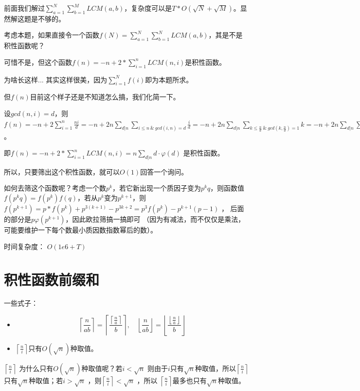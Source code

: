\begin{solution}
\label{exa:lcm2}
前面我们解过$\sum_{a=1}^{N}\sum_{b=1}^MLCM(a,b)$，复杂度可以是$T*O(\sqrt{N}+\sqrt{M})$。显然解这题是不够的。

考虑本题，如果直接令一个函数$f(N)=\sum_{a=1}^{N}\sum_{b=1}^NLCM(a,b)$，其是不是积性函数呢？

可惜不是，{\heiti 但这个函数$f(n)=-n+2*\sum_{i=1}^nLCM(n,i)$是积性函数。}

为啥长这样... 其实这样很美，因为$\sum_{i=1}^Nf(i)$即为本题所求。

但$f(n)$目前这个样子还是不知道怎么搞，我们化简一下。

设$gcd(n,i)=d$，则$f(n)=-n+2\sum_{i=1}^n\frac{ni}{d}=-n+2n\sum_{d|n}\sum_{i\le n \ \& \ gcd(i,n)=d}\frac{i}{d}=-n+2n\sum_{d|n}\sum_{k\le \frac{n}{d}\ \& \ gcd(k,\frac{n}{d})=1}k=-n+2n\sum_{d|n}\sum_{k\le d\  \& \ gcd(k,d)=1}k=-n+2n((\sum_{d|n\ \& \ d>1}\frac{d\varphi(d)}{2})+1)=n\sum_{d|n}d\varphi(d)$。 

即$f(n)=-n+2*\sum_{i=1}^nLCM(n,i)=n\sum_{d|n}d\cdot \varphi(d)$ 是积性函数。

所以，只要筛出这个积性函数，就可以$O(1)$回答一个询问。

如何去筛这个函数呢？考虑一个数$p^k$，若它新出现一个质因子变为$p^kq$，则函数值$f(p^kq)=f(p^k)f(q)$，若从$p^k$变为$p^{k+1}$，则$f(p^{k+1})=p*f(p^k)+p^{3(k+1)}-p^{3k+2}=p^3f(p^{k})-p^{k+1}(p-1)$   ， 后面的部分是$p\varphi(p^{k+1})$，因此欧拉筛搞一搞即可 （因为有减法，而不仅仅是乘法，可能要维护一下每个数最小质因数指数幂后的数）。

{\heiti 时间复杂度：} $O(1e6+T)$

\end{solution}

\section{积性函数前缀和}
{\heiti 一些式子：}

\begin{itemize}
\item $$
\left\lceil\frac{n}{a b}\right\rceil=\left\lceil \frac{\left\lceil \frac{n}{a}\right\rceil}{b}  \right\rceil, \quad\left\lfloor\frac{n}{a b}\right\rfloor=\left\lfloor\frac{\left\lfloor\frac{n}{a}\right\rfloor}{b}\right\rfloor
$$

\item $\left\lceil\frac{n}{i}\right\rceil$只有$O(\sqrt{n})$种取值。
\end{itemize}

$\left \lceil \frac{n}{i} \right \rceil$ 为什么只有$O(\sqrt{n})$种取值呢？若$i<\sqrt{n}$ 则由于$i$只有$\sqrt{n}$种取值，所以$\left \lceil \frac{n}{i} \right \rceil$只有$\sqrt{n}$种取值；若$i>\sqrt{n}$  ，则$\left \lceil \frac{n}{i} \right \rceil<\sqrt{n}$  ，所以 $\left \lceil \frac{n}{i} \right \rceil$最多也只有$\sqrt{n}$种取值。

